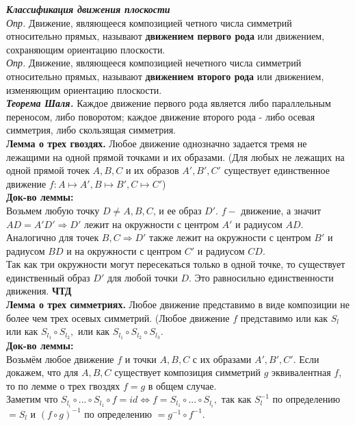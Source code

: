 \documentclass[12pt, oneside]{book}
\theoremstyle{definition}
\begin{document}
\begin{enumerate}
\textit{\textbf{Классификация движения плоскости}}\\
\textit{Опр.} Движение, являющееся композицией четного числа симметрий относительно прямых, называют \textbf{движением первого рода} или движением, сохраняющим ориентацию плоскости. \\
\textit{Опр.} Движение, являющееся композицией нечетного числа симметрий относительно прямых, называют \textbf{движением второго рода} или движением, изменяющим ориентацию плоскости. \\
\textit{\textbf{Теорема Шаля.}} Каждое движение первого рода является либо параллельным переносом, либо поворотом; каждое движение второго рода - либо осевая симметрия, либо скользящая симметрия. \\
\textbf{Лемма о трех гвоздях.} Любое движение однозначно задается тремя не лежащими на одной прямой точками и их образами. (Для любых не лежащих на одной прямой точек $A, B, C$ и их образов $A', B', C'$ существует единственное движение $f: A \mapsto A', B \mapsto B', C \mapsto C'$)\\
\textbf{Док-во леммы:}\\
Возьмем любую точку $D \neq A, B, C$, и ее образ $D'.$ $f -$ движение, а значит $AD = A'D' \Rightarrow D'$ лежит на окружности с центром $A'$ и радиусом $AD$. \\
Аналогично для точек $B, C \Rightarrow D'$ также лежит на окружности с центром $B'$ и радиусом $BD$ и на окружности с центром $C'$ и радиусом $CD$. \\
Так как три окружности могут пересекаться только в одной точке, то существует единственный образ $D'$ для любой точки $D$. Это равносильно единственности движения. \textbf{ЧТД} \\
\textbf{Лемма о трех симметриях.} Любое движение представимо в виде композиции не более чем трех осевых симметрий. (Любое движение $f$ представимо или как $S_l$ или как $S_{l_1} \circ S_{l_2},$ или как $S_{l_1} \circ S_{l_2} \circ S_{l_3}.$\\
\textbf{Док-во леммы:}\\
Возьмём любое движение $f$ и точки $A, B, C$ с их образами $A', B', C'.$ Если докажем, что для $A, B, C$ существует композиция симметрий $g$ эквивалентная $f$, то по лемме о трех гвоздях $f = g$ в общем случае. \\
Заметим что $S_{l_i} \circ ... \circ S_{l_1} \circ f = id \Leftrightarrow f = S_{l_1} \circ ... \circ S_{l_i},$ так как $S^{-1}_l$ по определению $= S_l$ и $(f \circ g)^{-1}$ по определению $= g^{-1} \circ f^{-1}.$\\

\end{enumerate}
\end{document}
